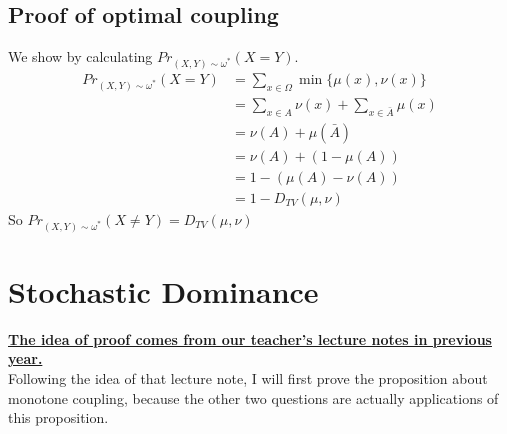\documentclass[12pt,letterpaper]{article}
\begin{document}
\subsection{Proof of optimal coupling}
We show by calculating $Pr_{(X,Y)\sim\omega^*}(X=Y)$.\\
\begin{align}
  Pr_{(X,Y)\sim\omega^*}(X=Y)&=\sum_{x\in\Omega}\min\{\mu(x),\nu(x)\}\\
  &=\sum_{x\in A}\nu(x)+\sum_{x\in\bar{A}}\mu(x)\\
  &=\nu(A)+\mu(\bar{A})\\
  &=\nu(A)+(1-\mu(A))\\
  &=1-(\mu(A)-\nu(A))\\
  &=1-D_{TV}(\mu,\nu)
\end{align}
So $Pr_{(X,Y)\sim\omega^*}(X\neq Y)=D_{TV}(\mu,\nu)$
\newpage 


\section{Stochastic Dominance}
\textbf{\underline{The idea of proof comes from our teacher's lecture notes in previous year.}}\\
Following the idea of that lecture note, I will first prove the proposition about monotone coupling, because the other two questions are actually applications of this proposition.
\end{document}
